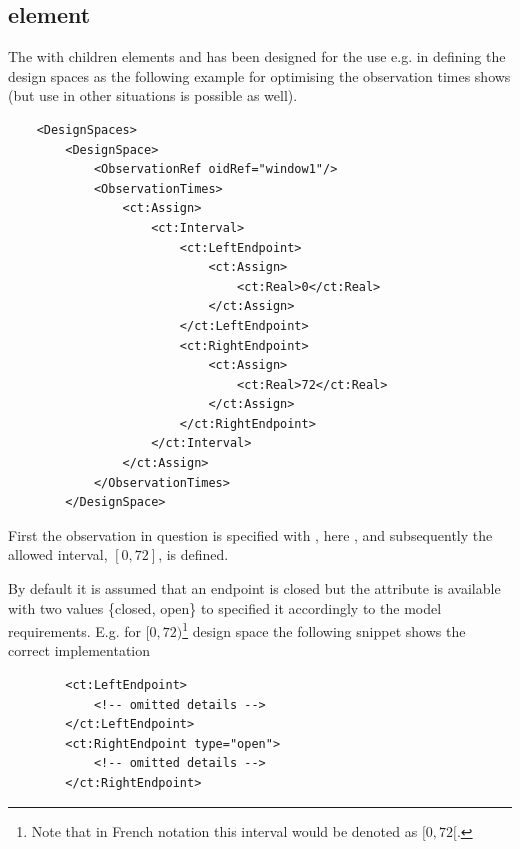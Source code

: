 \subsection{ element}
\label{subsec:interval}
The  with children elements  and 
has been designed for the use e.g. in defining the design spaces as the 
following example for optimising the observation times shows (but use in other 
situations is possible as well). 
\lstset{language=XML}
\begin{lstlisting}
    <DesignSpaces>
        <DesignSpace>
            <ObservationRef oidRef="window1"/>
            <ObservationTimes>
                <ct:Assign>
                    <ct:Interval>
                        <ct:LeftEndpoint>
                            <ct:Assign>
                                <ct:Real>0</ct:Real>
                            </ct:Assign>
                        </ct:LeftEndpoint>
                        <ct:RightEndpoint>
                            <ct:Assign>
                                <ct:Real>72</ct:Real>
                            </ct:Assign>
                        </ct:RightEndpoint>
                    </ct:Interval>
                </ct:Assign>
            </ObservationTimes>
        </DesignSpace>
\end{lstlisting}
First the observation in question is specified with , 
here , and subsequently the allowed interval, $[0,72]$, is defined.

By default it is assumed that an endpoint is closed but the attribute 
is available with two values \{closed, open\} to specified it accordingly to the 
model requirements. E.g. for $[0,72)$\footnote{Note that in French notation this interval
would be denoted as $[0,72[$.} design space the following snippet shows the 
correct implementation
\lstset{language=XML}
\begin{lstlisting}
        <ct:LeftEndpoint>
            <!-- omitted details -->
        </ct:LeftEndpoint>
        <ct:RightEndpoint type="open">
            <!-- omitted details -->
        </ct:RightEndpoint>
\end{lstlisting}



